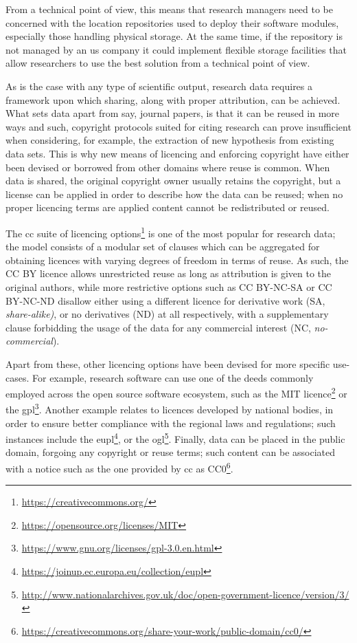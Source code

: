 From a technical point of view, this means that research managers need to be concerned with the location repositories used to deploy their software modules, especially those handling physical storage. At the same time, if the repository is not managed by an \gls{us} company it could implement flexible storage facilities that allow researchers to use the best solution from a technical point of view. 

As is the case with any type of scientific output, research data requires a framework upon which sharing, along with proper attribution, can be achieved. What sets data apart from say, journal papers, is that it can be reused in more ways and such, copyright protocols suited for citing research can prove insufficient when considering, for example, the extraction of new hypothesis from existing data sets. This is why new means of licencing and enforcing copyright have either been devised or borrowed from other domains where reuse is common. When data is shared, the original copyright owner usually retains the copyright, but a license can be applied in order to describe how the data can be reused; when no proper licencing terms are applied content cannot be redistributed or reused.

The \gls{cc} suite of licencing options\footnote{\url{https://creativecommons.org/}} is one of the most popular for research data; the model consists of a modular set of clauses which can be aggregated for obtaining licences with varying degrees of freedom in terms of reuse. As such, the CC BY licence allows unrestricted reuse as long as attribution is given to the original authors, while more restrictive options such as CC BY-NC-SA or CC BY-NC-ND disallow either using a different licence for derivative work (SA, \emph{share-alike)}, or no derivatives (ND) at all respectively, with a supplementary clause forbidding the usage of the data for any commercial interest (NC, \emph{no-commercial}).

Apart from these, other licencing options have been devised for more specific use-cases. For example, research software can use one of the deeds commonly employed across the open source software ecosystem, such as the MIT licence\footnote{\url{https://opensource.org/licenses/MIT}} or the \gls{gpl}\footnote{\url{https://www.gnu.org/licenses/gpl-3.0.en.html}}. Another example relates to licences developed by national bodies, in order to ensure better compliance with the regional laws and regulations; such instances include the \gls{eupl}\footnote{\url{https://joinup.ec.europa.eu/collection/eupl}}, or the \gls{ogl}\footnote{\url{http://www.nationalarchives.gov.uk/doc/open-government-licence/version/3/}}. Finally, data can be placed in the public domain, forgoing any copyright or reuse terms; such content can be associated with a notice such as the one provided by \gls{cc} as CC0\footnote{\url{https://creativecommons.org/share-your-work/public-domain/cc0/}}.

